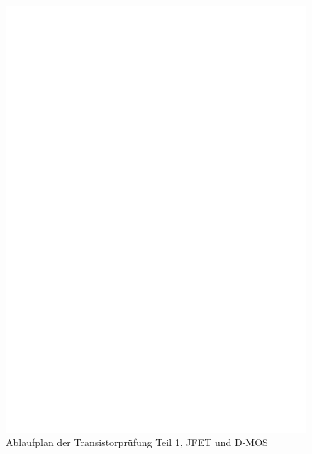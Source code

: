 \begin{figure}[H]
\centering
\includegraphics[]{../FIG/CheckSemi1.eps}
\caption{Ablaufplan der Transistorprüfung Teil 1, JFET und D-MOS}
\label{fig:ChkSemi1}
\end{figure}


